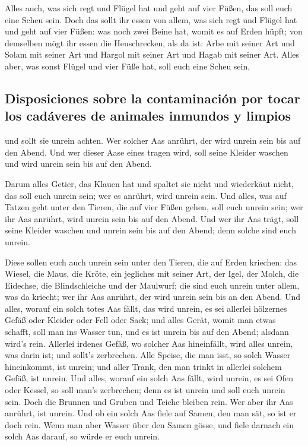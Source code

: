  Alles auch, was sich regt und Flügel hat und geht auf
vier Füßen, das soll euch eine Scheu sein.  Doch das
sollt ihr essen von allem, was sich regt und Flügel hat und geht auf
vier Füßen: was noch zwei Beine hat, womit es auf Erden hüpft;
 von demselben mögt ihr essen die Heuschrecken, als da
ist: Arbe mit seiner Art und Solam mit seiner Art und Hargol mit seiner
Art und Hagab mit seiner Art.  Alles aber, was sonst
Flügel und vier Füße hat, soll euch eine Scheu sein,

\hypertarget{disposiciones-sobre-la-contaminaciuxf3n-por-tocar-los-caduxe1veres-de-animales-inmundos-y-limpios}{%
\subsection{Disposiciones sobre la contaminación por tocar los cadáveres
de animales inmundos y
limpios}\label{disposiciones-sobre-la-contaminaciuxf3n-por-tocar-los-caduxe1veres-de-animales-inmundos-y-limpios}}

 und sollt sie unrein achten. Wer solcher Aas anrührt,
der wird unrein sein bis auf den Abend.  Und wer dieser
Aase eines tragen wird, soll seine Kleider waschen und wird unrein sein
bis auf den Abend.

 Darum alles Getier, das Klauen hat und spaltet sie nicht
und wiederkäut nicht, das soll euch unrein sein; wer es anrührt, wird
unrein sein.  Und alles, was auf Tatzen geht unter den
Tieren, die auf vier Füßen gehen, soll euch unrein sein; wer ihr Aas
anrührt, wird unrein sein bis auf den Abend.  Und wer ihr
Aas trägt, soll seine Kleider waschen und unrein sein bis auf den Abend;
denn solche sind euch unrein.

 Diese sollen euch auch unrein sein unter den Tieren, die
auf Erden kriechen: das Wiesel, die Maus, die Kröte, ein jegliches mit
seiner Art,  der Igel, der Molch, die Eidechse, die
Blindschleiche und der Maulwurf;  die sind euch unrein
unter allem, was da kriecht; wer ihr Aas anrührt, der wird unrein sein
bis an den Abend.  Und alles, worauf ein solch totes Aas
fällt, das wird unrein, es sei allerlei hölzernes Gefäß oder Kleider
oder Fell oder Sack; und alles Gerät, womit man etwas schafft, soll man
ins Wasser tun, und es ist unrein bis auf den Abend; alsdann wird's
rein.  Allerlei irdenes Gefäß, wo solcher Aas
hineinfällt, wird alles unrein, was darin ist; und sollt's zerbrechen.
 Alle Speise, die man isst, so solch Wasser hineinkommt,
ist unrein; und aller Trank, den man trinkt in allerlei solchem Gefäß,
ist unrein.  Und alles, worauf ein solch Aas fällt, wird
unrein, es sei Ofen oder Kessel, so soll man's zerbrechen; denn es ist
unrein und soll euch unrein sein.  Doch die Brunnen und
Gruben und Teiche bleiben rein. Wer aber ihr Aas anrührt, ist unrein.
 Und ob ein solch Aas fiele auf Samen, den man sät, so
ist er doch rein.  Wenn man aber Wasser über den Samen
gösse, und fiele darnach ein solch Aas darauf, so würde er euch unrein.


